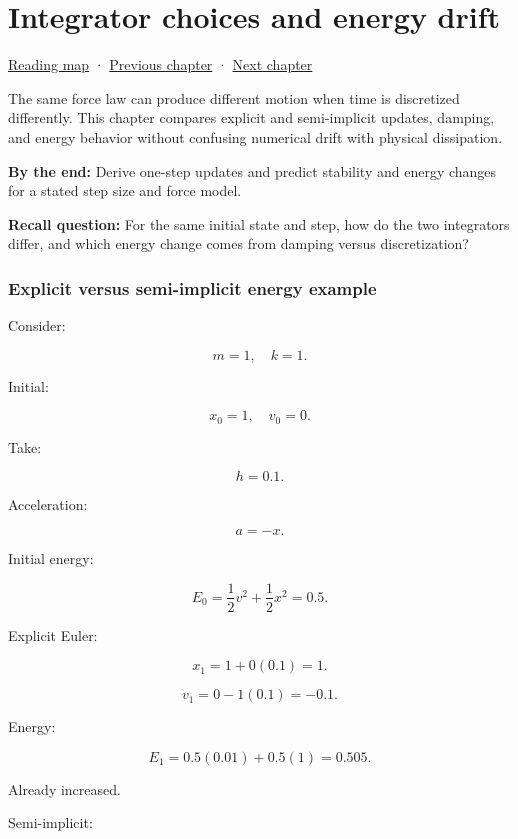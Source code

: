 \chapter{Integrator choices and energy drift}\label{06-engine-ii-ch038-integrator-choices-and-energy-drift}\hypertarget{06-engine-ii-ch038}{}\label{stagechapter:06-engine-ii-ch038}

\hyperref[volume-reading-map]{Reading map} · \hyperref[06-engine-ii-ch037-physical-examples-and-state-validation]{Previous chapter} · \hyperref[06-engine-ii-ch039-composable-timesteps-and-stable-simulation-policy]{Next chapter}

The same force law can produce different motion when time is discretized differently. This chapter compares explicit and semi-implicit updates, damping, and energy behavior without confusing numerical drift with physical dissipation.

\textbf{By the end:} Derive one-step updates and predict stability and energy changes for a stated step size and force model.

\textbf{Recall question:} For the same initial state and step, how do the two integrators differ, and which energy change comes from damping versus discretization?

\subsection{Explicit versus semi-implicit energy example}\label{06-engine-ii-ch038-explicit-versus-semi-implicit-energy-example}

Consider:

\[
m=1,\quad k=1.
\]

Initial:

\[
x_0=1,\quad v_0=0.
\]

Take:

\[
h=0.1.
\]

Acceleration:

\[
a=-x.
\]

Initial energy:

\[
E_0
=
\frac12v^2+
\frac12x^2
=
0.5.
\]

Explicit Euler:

\[
x_1=1+0(0.1)=1.
\]

\[
v_1=0-1(0.1)=-0.1.
\]

Energy:

\[
E_1
=
0.5(0.01)
+
0.5(1)
=
0.505.
\]

Already increased.

Semi-implicit:

